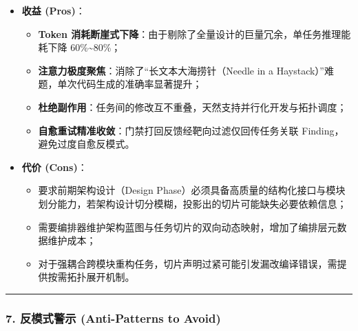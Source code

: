 \documentclass[
]{ctexart}
\providecommand{\tightlist}{%
  \setlength{\itemsep}{0pt}\setlength{\parskip}{0pt}}
\renewcommand{\_}{\discretionary{}{}{\textunderscore}}
\begin{document}
\begin{itemize}
\tightlist
\item
  \textbf{收益 (Pros)}：

  \begin{itemize}
  \tightlist
  \item
    \textbf{Token
    消耗断崖式下降}：由于剔除了全量设计的巨量冗余，单任务推理能耗下降
    60\%\textasciitilde80\%；
  \item
    \textbf{注意力极度聚焦}：消除了``长文本大海捞针（Needle in a
    Haystack）''难题，单次代码生成的准确率显著提升；
  \item
    \textbf{杜绝副作用}：任务间的修改互不重叠，天然支持并行化开发与拓扑调度；
  \item
    \textbf{自愈重试精准收敛}：门禁打回反馈经靶向过滤仅回传任务关联
    Finding，避免过度自愈反模式。
  \end{itemize}
\item
  \textbf{代价 (Cons)}：

  \begin{itemize}
  \tightlist
  \item
    要求前期架构设计（Design
    Phase）必须具备高质量的结构化接口与模块划分能力，若架构设计切分模糊，投影出的切片可能缺失必要依赖信息；
  \item
    需要编排器维护架构蓝图与任务切片的双向动态映射，增加了编排层元数据维护成本；
  \item
    对于强耦合跨模块重构任务，切片声明过紧可能引发漏改编译错误，需提供按需拓扑展开机制。
  \end{itemize}
\end{itemize}

\begin{center}\rule{0.5\linewidth}{0.5pt}\end{center}

\subsubsection{7. 反模式警示 (Anti-Patterns to
Avoid)}\label{ux53cdux6a21ux5f0fux8b66ux793a-anti-patterns-to-avoid-3}
\end{document}
